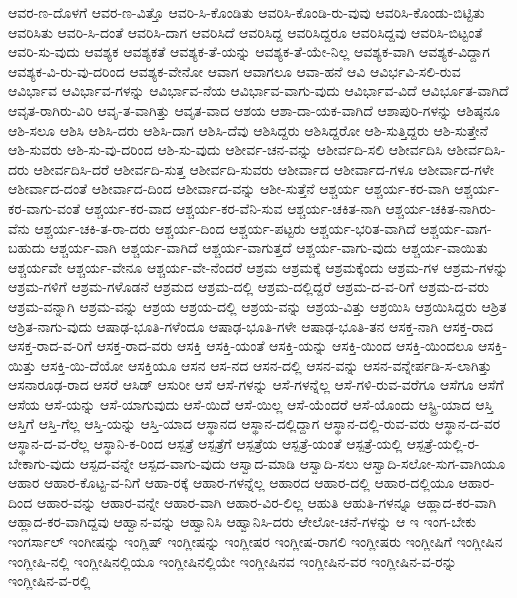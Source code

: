 {ಆವರ-ಣ-ದೊಳಗೆ
ಆವರ-ಣ-ವಿತ್ತೊ
ಆವರಿ-ಸಿ-ಕೊಂಡಿತು
ಆವರಿಸಿ-ಕೊಂಡಿ-ರು-ವುವು
ಆವರಿಸಿ-ಕೊಂಡು-ಬಿಟ್ಟಿತು
ಆವರಿಸಿತು
ಆವರಿ-ಸಿ-ದಂತೆ
ಆವರಿಸಿ-ದಾಗ
ಆವರಿಸಿದೆ
ಆವರಿಸಿದ್ದ
ಆವರಿಸಿದ್ದರೂ
ಆವರಿಸಿದ್ದವು
ಆವರಿಸಿ-ಬಿಟ್ಟಂತೆ
ಆವರಿ-ಸು-ವುದು
ಆವಶ್ಯಕ
ಆವಶ್ಯಕತೆ
ಆವಶ್ಯಕ-ತೆ-ಯನ್ನು
ಆವಶ್ಯಕ-ತೆ-ಯೇ-ನಿಲ್ಲ
ಆವಶ್ಯಕ-ವಾಗಿ
ಆವಶ್ಯಕ-ವಿದ್ದಾಗ
ಆವಶ್ಯಕ-ವಿ-ರು-ವು-ದರಿಂದ
ಆವಶ್ಯಕ-ವೇನೋ
ಆವಾಗ
ಆವಾಗಲೂ
ಆವಾ-ಹನೆ
ಆವಿ
ಆವಿರ್ಭವಿ-ಸಲಿ-ರುವ
ಆವಿರ್ಭಾವ
ಆವಿರ್ಭಾವ-ಗಳನ್ನು
ಆವಿರ್ಭಾವ-ನೆಯ
ಆವಿರ್ಭಾವ-ವಾಗು-ವುದು
ಆವಿರ್ಭಾವ-ವಿದೆ
ಆವಿರ್ಭೂತ-ವಾಗಿದೆ
ಆವೃತ-ರಾಗಿರು-ವಿರಿ
ಆವೃ-ತ-ವಾಗಿತ್ತು
ಆವೃತ-ವಾದ
ಆಶಯ
ಆಶಾ-ದಾ-ಯಕ-ವಾಗಿದೆ
ಆಶಾಪುರಿ-ಗಳನ್ನು
ಆಶಿಷ್ಠನೂ
ಆಶಿ-ಸಲೂ
ಆಶಿಸಿ
ಆಶಿಸಿ-ದರು
ಆಶಿಸಿ-ದಾಗ
ಆಶಿಸಿ-ದೆವು
ಆಶಿಸಿದ್ದರು
ಆಶಿಸಿದ್ದರೋ
ಆಶಿ-ಸುತ್ತಿದ್ದರು
ಆಶಿ-ಸುತ್ತೇನೆ
ಆಶಿ-ಸುವರು
ಆಶಿ-ಸು-ವು-ದರಿಂದ
ಆಶಿ-ಸು-ವುದು
ಆಶೀರ್ವ-ಚನ-ವನ್ನು
ಆಶೀರ್ವದಿ-ಸಲಿ
ಆಶೀರ್ವದಿಸಿ
ಆಶೀರ್ವದಿಸಿ-ದರು
ಆಶೀರ್ವದಿಸಿ-ದರೆ
ಆಶೀರ್ವದಿ-ಸುತ್ತ
ಆಶೀರ್ವದಿ-ಸುವರು
ಆಶೀರ್ವಾದ
ಆಶೀರ್ವಾದ-ಗಳೂ
ಆಶೀರ್ವಾದ-ಗಳೇ
ಆಶೀರ್ವಾದ-ದಂತೆ
ಆಶೀರ್ವಾದ-ದಿಂದ
ಆಶೀರ್ವಾದ-ವನ್ನು
ಆಶೀ-ಸುತ್ತೆನೆ
ಆಶ್ಚರ್ಯ
ಆಶ್ಚರ್ಯ-ಕರ-ವಾಗಿ
ಆಶ್ಚರ್ಯ-ಕರ-ವಾಗು-ವಂತೆ
ಆಶ್ಚರ್ಯ-ಕರ-ವಾದ
ಆಶ್ಚರ್ಯ-ಕರ-ವೆನಿ-ಸುವ
ಆಶ್ಚರ್ಯ-ಚಕಿತ-ನಾಗಿ
ಆಶ್ಚರ್ಯ-ಚಕಿತ-ನಾಗಿರು-ವೆನು
ಆಶ್ಚರ್ಯ-ಚಕಿ-ತ-ರಾ-ದರು
ಆಶ್ಚರ್ಯ-ದಿಂದ
ಆಶ್ಚರ್ಯ-ಪಟ್ಟರು
ಆಶ್ಚರ್ಯ-ಭರಿತ-ವಾಗಿದೆ
ಆಶ್ಚರ್ಯ-ವಾಗ-ಬಹುದು
ಆಶ್ಚರ್ಯ-ವಾಗಿ
ಆಶ್ಚರ್ಯ-ವಾಗಿದೆ
ಆಶ್ಚರ್ಯ-ವಾಗುತ್ತದೆ
ಆಶ್ಚರ್ಯ-ವಾಗು-ವುದು
ಆಶ್ಚರ್ಯ-ವಾಯಿತು
ಆಶ್ಚರ್ಯವೇ
ಆಶ್ಚರ್ಯ-ವೇನೂ
ಆಶ್ಚರ್ಯ-ವೇ-ನೆಂದರೆ
ಆಶ್ರಮ
ಆಶ್ರಮಕ್ಕೆ
ಆಶ್ರಮಕ್ಕೆಂದು
ಆಶ್ರಮ-ಗಳ
ಆಶ್ರಮ-ಗಳನ್ನು
ಆಶ್ರಮ-ಗಳಿಗೆ
ಆಶ್ರಮ-ಗಳೊಡನೆ
ಆಶ್ರಮದ
ಆಶ್ರಮ-ದಲ್ಲಿ
ಆಶ್ರಮ-ದಲ್ಲಿದ್ದರೆ
ಆಶ್ರಮ-ದ-ವ-ರಿಗೆ
ಆಶ್ರಮ-ದ-ವರು
ಆಶ್ರಮ-ವನ್ನಾಗಿ
ಆಶ್ರಮ-ವನ್ನು
ಆಶ್ರಯ
ಆಶ್ರಯ-ದಲ್ಲಿ
ಆಶ್ರಯ-ವನ್ನು
ಆಶ್ರಯ-ವಿತ್ತು
ಆಶ್ರಯಿಸಿ
ಆಶ್ರಯಿಸಿದ್ದರು
ಆಶ್ರಿತ
ಆಶ್ರಿತ-ನಾಗು-ವುದು
ಆಷಾಢ-ಭೂತಿ-ಗಳೆಂದೂ
ಆಷಾಢ-ಭೂತಿ-ಗಳೇ
ಆಷಾಢ-ಭೂತಿ-ತನ
ಆಸಕ್ತ-ನಾಗಿ
ಆಸಕ್ತ-ರಾದ
ಆಸಕ್ತ-ರಾದ-ವ-ರಿಗೆ
ಆಸಕ್ತ-ರಾದ-ವರು
ಆಸಕ್ತಿ
ಆಸಕ್ತಿ-ಯಂತೆ
ಆಸಕ್ತಿ-ಯನ್ನು
ಆಸಕ್ತಿ-ಯಿಂದ
ಆಸಕ್ತಿ-ಯಿಂದಲೂ
ಆಸಕ್ತಿ-ಯಿತ್ತು
ಆಸಕ್ತಿ-ಯಿ-ದೆಯೋ
ಆಸಕ್ತಿಯೂ
ಆಸನ
ಆಸ-ನದ
ಆಸನ-ದಲ್ಲಿ
ಆಸನ-ವನ್ನು
ಆಸನ-ವನ್ನೇರ್ಪಡಿ-ಸ-ಲಾಗಿತ್ತು
ಆಸನಾರೂಢ-ರಾದ
ಆಸರೆ
ಆಸಿಡ್
ಆಸುರೀ
ಆಸೆ
ಆಸೆ-ಗಳನ್ನು
ಆಸೆ-ಗಳನ್ನೆಲ್ಲ
ಆಸೆ-ಗಳಿ-ರುವ-ವರೆಗೂ
ಆಸೆಗೂ
ಆಸೆಗೆ
ಆಸೆಯ
ಆಸೆ-ಯನ್ನು
ಆಸೆ-ಯಾಗುವುದು
ಆಸೆ-ಯಿದೆ
ಆಸೆ-ಯಿಲ್ಲ
ಆಸೆ-ಯೆಂದರೆ
ಆಸೆ-ಯೊಂದು
ಆಸ್ಟ್ರಿ-ಯಾದ
ಆಸ್ತಿ
ಆಸ್ತಿಗೆ
ಆಸ್ತಿ-ಗೆಲ್ಲ
ಆಸ್ತಿ-ಯನ್ನು
ಆಸ್ತಿ-ಯಾದ
ಆಸ್ಥಾನದ
ಆಸ್ಥಾನ-ದಲ್ಲಿದ್ದಾಗ
ಆಸ್ಥಾನ-ದಲ್ಲಿ-ರುವ-ವರು
ಆಸ್ಥಾನ-ದ-ವರ
ಆಸ್ಥಾನ-ದ-ವ-ರೆಲ್ಲ
ಆಸ್ಥಾನಿ-ಕ-ರಿಂದ
ಆಸ್ಪತ್ರೆ
ಆಸ್ಪತ್ರೆಗೆ
ಆಸ್ಪತ್ರೆಯ
ಆಸ್ಪತ್ರೆ-ಯಂತೆ
ಆಸ್ಪತ್ರೆ-ಯಲ್ಲಿ
ಆಸ್ಪತ್ರೆ-ಯಲ್ಲಿ-ರ-ಬೇಕಾಗು-ವುದು
ಆಸ್ಪದ-ವನ್ನೇ
ಆಸ್ಪದ-ವಾಗು-ವುದು
ಆಸ್ವಾದ-ಮಾಡಿ
ಆಸ್ವಾದಿ-ಸಲು
ಆಸ್ವಾದಿ-ಸಲೋ-ಸುಗ-ವಾಗಿಯೂ
ಆಹಾರ
ಆಹಾರ-ಕೊಟ್ಟ-ವ-ನಿಗೆ
ಆಹಾ-ರಕ್ಕೆ
ಆಹಾರ-ಗಳನ್ನೆಲ್ಲ
ಆಹಾರದ
ಆಹಾರ-ದಲ್ಲಿ
ಆಹಾರ-ದಲ್ಲಿಯೂ
ಆಹಾರ-ದಿಂದ
ಆಹಾರ-ವನ್ನು
ಆಹಾರ-ವನ್ನೇ
ಆಹಾರ-ವಾಗಿ
ಆಹಾರ-ವಿರ-ಲಿಲ್ಲ
ಆಹುತಿ
ಆಹುತಿ-ಗಳನ್ನೂ
ಆಹ್ಲಾದ-ಕರ-ವಾಗಿ
ಆಹ್ಲಾದ-ಕರ-ವಾಗಿದ್ದವು
ಆಹ್ವಾನ-ವನ್ನು
ಆಹ್ವಾನಿಸಿ
ಆಹ್ವಾನಿಸಿ-ದರು
ಆೇಲೋ-ಚನೆ-ಗಳನ್ನು
ಆ
ಇ
ಇಂಗ-ಬೇಕು
ಇಂಗರ್ಸಾಲ್
ಇಂಗೀಷನ್ನು
ಇಂಗ್ಲಿಷ್
ಇಂಗ್ಲೀಷನ್ನು
ಇಂಗ್ಲೀಷರ
ಇಂಗ್ಲೀಷ-ರಾಗಲಿ
ಇಂಗ್ಲೀಷರು
ಇಂಗ್ಲೀಷಿಗೆ
ಇಂಗ್ಲೀಷಿನ
ಇಂಗ್ಲೀಷಿ-ನಲ್ಲಿ
ಇಂಗ್ಲೀಷಿನಲ್ಲಿಯೂ
ಇಂಗ್ಲೀಷಿನಲ್ಲಿಯೇ
ಇಂಗ್ಲೀಷಿನವ
ಇಂಗ್ಲೀಷಿನ-ವರ
ಇಂಗ್ಲೀಷಿನ-ವ-ರನ್ನು
ಇಂಗ್ಲೀಷಿನ-ವ-ರಲ್ಲಿ
}
